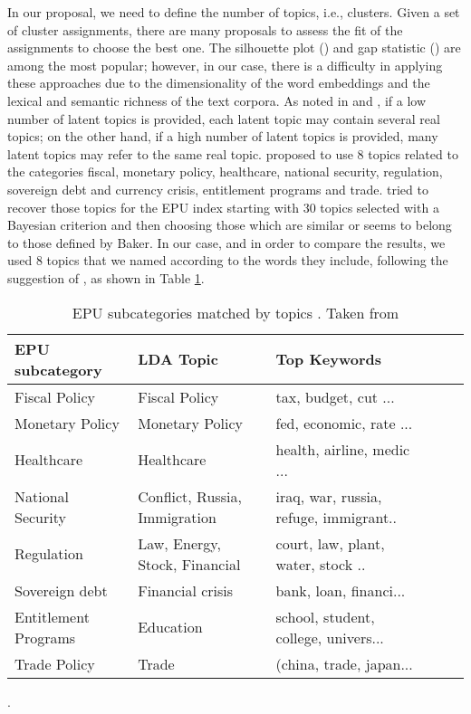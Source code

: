 \documentclass{article}
\begin{document}
In our proposal, we need to define the number of topics, i.e., clusters. Given a set of cluster assignments, there are many proposals to assess the fit of the assignments to choose the best one. The silhouette plot (\cite{Rousseeuw1987}) and gap statistic (\cite{Tibishirani_gap}) are among the most popular; however, in our case, there is a difficulty in applying these approaches due to the dimensionality of the word embeddings and the lexical and semantic richness of the text corpora. As noted in \cite{Vargas2019a} and \cite{Vargas2019b}, if a low number of latent topics is provided, each latent topic may contain several real topics; on the other hand, if a high number of latent topics is provided, many latent topics may refer to the same real topic. \cite{Baker2016} proposed to use 8 topics related to the categories fiscal, monetary policy, healthcare, national security, regulation, sovereign debt and currency crisis, entitlement programs and trade. \cite{Azqueta2017} tried to recover those topics for the EPU index starting with 30 topics selected with a Bayesian criterion and then choosing those which are similar or seems to belong to those defined by Baker. In our case, and in order to compare the results, we used 8 topics that we named according to the words they include, following the suggestion of \cite{Azqueta2017}, as shown in Table \ref{tab:tabla1}. 

\begin{table}[H]
\footnotesize
\centering
\begin{tabular}{llllll}
    \toprule
     \textbf{EPU subcategory}  & LDA Topic  & Top Keywords   \\
   \midrule
    Fiscal Policy & Fiscal Policy & {tax, budget, cut ...} \\
        Monetary Policy & Monetary Policy & {fed, economic, rate ...} \\
        Healthcare & Healthcare & {health, airline, medic ...} \\
        National Security & Conflict, Russia, Immigration & {iraq, war, russia, refuge, immigrant..} \\
        Regulation & Law, Energy, Stock, Financial & {court, law, plant, water, stock ..} \\
        Sovereign debt & Financial crisis & {bank, loan, financi...} \\
       Entitlement Programs & Education & {school, student, college, univers...} \\        
       Trade Policy & Trade & {(china, trade, japan...} \\   
       \bottomrule
\end{tabular}
\caption{EPU subcategories matched by topics \citep{Baker2016}. Taken from \cite{Azqueta2017}}.
\label{tab:tabla1}
\end{table}
\end{document}
